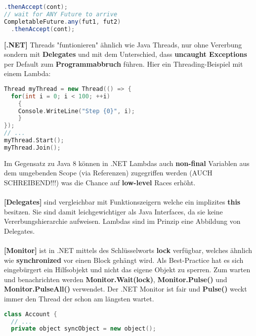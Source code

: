 \documentclass[8pt]{extarticle}
\let\oldtextbf\textbf
\renewcommand{\textbf}{\tiny\oldtextbf}
\begin{document}
\begin{multicols*}{5}
\begin{lstlisting}[language=java]
  .thenAccept(cont);
// wait for ANY Future to arrive
CompletableFuture.any(fut1, fut2)
  .thenAccept(cont);
\end{lstlisting}
\textbf{[.NET]} Threads "funtionieren" ähnlich wie Java Threads, nur ohne Vererbung sondern mit \textbf{Delegates} und mit dem Unterschied, dass \textbf{uncaught Exceptions} per Default zum \textbf{Programmabbruch} führen. Hier ein Threading-Beispiel mit einem Lambda:
\begin{lstlisting}[language=c++]
Thread myThread = new Thread(() => {
  for(int i = 0; i < 100; ++i)
    {
    Console.WriteLine("Step {0}", i);
    }
});
// ...
myThread.Start();
myThread.Join();
\end{lstlisting}
Im Gegensatz zu Java 8 können in .NET Lambdas auch \textbf{non-final} Variablen aus dem umgebenden Scope (via Referenzen) zugegriffen werden (AUCH SCHREIBEND!!!) was die Chance auf \textbf{low-level} Races erhöht.\\\\
\textbf{[Delegates]} sind vergleichbar mit Funktionszeigern welche ein implizites \textbf{this} besitzen. Sie sind damit leichgewichtiger als Java Interfaces, da sie keine Vererbungshierarchie aufweisen. Lambdas sind im Prinzip eine Abbildung von Delegates.\\\\
\textbf{[Monitor]} ist in .NET mittels des Schlüsselworts \textbf{lock} verfügbar, welches ähnlich wie \textbf{synchronized} vor einen Block gehängt wird. Als Best-Practice hat es sich eingebürgert ein Hilfsobjekt und nicht das eigene Objekt zu sperren. Zum warten und benachrichten werden \textbf{Monitor.Wait(lock)}, \textbf{Monitor.Pulse()} und \textbf{Monitor.PulseAll()} verwendet. Der .NET Monitor ist fair und \textbf{Pulse()} weckt immer den Thread der schon am längsten wartet.
\begin{lstlisting}[language=c++]
class Account {
  // ...
  private object syncObject = new object();


\end{lstlisting}
\end{multicols*}
\end{document}
